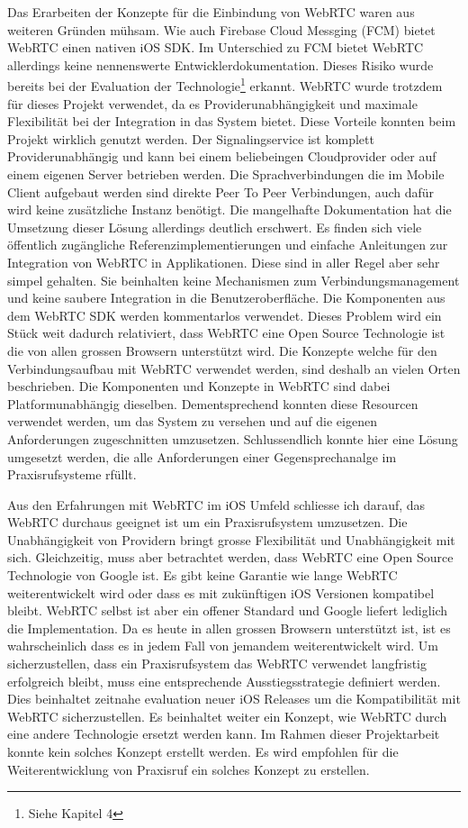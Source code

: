 Das Erarbeiten der Konzepte für die Einbindung von WebRTC waren aus weiteren Gründen mühsam.
Wie auch Firebase Cloud Messging (FCM) bietet WebRTC einen nativen iOS SDK.
Im Unterschied zu FCM bietet WebRTC allerdings keine nennenswerte Entwicklerdokumentation.
Dieses Risiko wurde bereits bei der Evaluation der Technologie\footnote{Siehe Kapitel 4} erkannt.
WebRTC wurde trotzdem für dieses Projekt verwendet, da es Providerunabhängigkeit und maximale Flexibilität bei der Integration in das System bietet.
Diese Vorteile konnten beim Projekt wirklich genutzt werden.
Der Signalingservice ist komplett Providerunabhängig und kann bei einem beliebeingen Cloudprovider oder auf einem eigenen Server betrieben werden.
Die Sprachverbindungen die im Mobile Client aufgebaut werden sind direkte Peer To Peer Verbindungen, auch dafür wird keine zusätzliche Instanz benötigt.
Die mangelhafte Dokumentation hat die Umsetzung dieser Lösung allerdings deutlich erschwert.
Es finden sich viele öffentlich zugängliche Referenzimplementierungen und einfache Anleitungen zur Integration von WebRTC in Applikationen.
Diese sind in aller Regel aber sehr simpel gehalten.
Sie beinhalten keine Mechanismen zum Verbindungsmanagement und keine saubere Integration in die Benutzeroberfläche.
Die Komponenten aus dem WebRTC SDK werden kommentarlos verwendet.
Dieses Problem wird ein Stück weit dadurch relativiert, dass WebRTC eine Open Source Technologie ist die von allen grossen Browsern unterstützt wird.
Die Konzepte welche für den Verbindungsaufbau mit WebRTC verwendet werden, sind deshalb an vielen Orten beschrieben.
Die Komponenten und Konzepte in WebRTC sind dabei Platformunabhängig dieselben.
Dementsprechend konnten diese Resourcen verwendet werden, um das System zu versehen und auf die eigenen Anforderungen zugeschnitten umzusetzen.
Schlussendlich konnte hier eine Lösung umgesetzt werden, die alle Anforderungen einer Gegensprechanalge im Praxisrufsysteme rfüllt.

Aus den Erfahrungen mit WebRTC im iOS Umfeld schliesse ich darauf, das WebRTC durchaus geeignet ist um ein Praxisrufsystem umzusetzen.
Die Unabhängigkeit von Providern bringt grosse Flexibilität und Unabhängigkeit mit sich.
Gleichzeitig, muss aber betrachtet werden, dass WebRTC eine Open Source Technologie von Google ist.
Es gibt keine Garantie wie lange WebRTC weiterentwickelt wird oder dass es mit zukünftigen iOS Versionen kompatibel bleibt.
WebRTC selbst ist aber ein offener Standard und Google liefert lediglich die Implementation.
Da es heute in allen grossen Browsern unterstützt ist, ist es wahrscheinlich dass es in jedem Fall von jemandem weiterentwickelt wird.
Um sicherzustellen, dass ein Praxisrufsystem das WebRTC verwendet langfristig erfolgreich bleibt, muss eine entsprechende Ausstiegsstrategie definiert werden.
Dies beinhaltet zeitnahe evaluation neuer iOS Releases um die Kompatibilität mit WebRTC sicherzustellen.
Es beinhaltet weiter ein Konzept, wie WebRTC durch eine andere Technologie ersetzt werden kann.
Im Rahmen dieser Projektarbeit konnte kein solches Konzept erstellt werden.
Es wird empfohlen für die Weiterentwicklung von Praxisruf ein solches Konzept zu erstellen.


